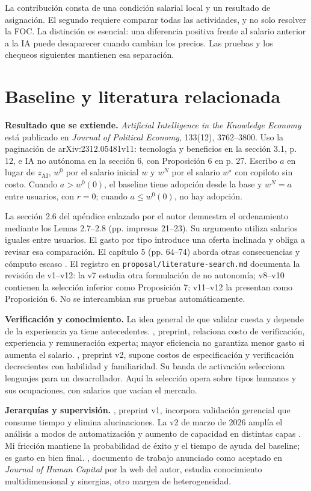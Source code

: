 \documentclass[11pt]{article}
\begin{document}
La contribución consta de una condición salarial local y un resultado de asignación. El segundo requiere comparar todas las actividades, y no solo resolver la FOC. La distinción es esencial: una diferencia positiva frente al salario anterior a la IA puede desaparecer cuando cambian los precios. Las pruebas y los chequeos siguientes mantienen esa separación.
\newpage
\section{Baseline y literatura relacionada}
\textbf{Resultado que se extiende.} \emph{Artificial Intelligence in the Knowledge Economy} está publicado en \emph{Journal of Political Economy}, 133(12), 3762--3800. Uso la paginación de arXiv:2312.05481v11: tecnología y beneficios en la sección 3.1, p. 12, e IA no autónoma en la sección 6, con Proposición 6 en p. 27. Escribo $a$ en lugar de $z_{\mathrm{AI}}$, $w^0$ por el salario inicial $w$ y $w^N$ por el salario $w^\star$ con copiloto sin costo. Cuando $a>w^0(0)$, el baseline tiene adopción desde la base y $w^N=a$ entre usuarios, con $r=0$; cuando $a\leq w^0(0)$, no hay adopción.

La sección 2.6 del apéndice enlazado por el autor demuestra el ordenamiento mediante los Lemas 2.7--2.8 (pp. impresas 21--23). Su argumento utiliza salarios iguales entre usuarios. El gasto por tipo introduce una oferta inclinada y obliga a revisar esa comparación. El capítulo 5 (pp. 64--74) aborda otras consecuencias y cómputo escaso \citep{appendix}. El registro en \texttt{proposal/literature-search.md} documenta la revisión de v1--v12: la v7 estudia otra formulación de no autonomía; v8--v10 contienen la selección inferior como Proposición 7; v11--v12 la presentan como Proposición 6. No se intercambian sus pruebas automáticamente.

\textbf{Verificación y conocimiento.} La idea general de que validar cuesta y depende de la experiencia ya tiene antecedentes. \citet{catalini}, preprint, relaciona costo de verificación, experiencia y remuneración experta; mayor eficiencia no garantiza menor gasto si aumenta el salario. \citet{quispe2026}, preprint v2, supone costos de especificación y verificación decrecientes con habilidad y familiaridad. Su banda de activación selecciona lenguajes para un desarrollador. Aquí la selección opera sobre tipos humanos y sus ocupaciones, con salarios que vacían el mercado.

\textbf{Jerarquías y supervisión.} \citet{xu2025}, preprint v1, incorpora validación gerencial que consume tiempo y elimina alucinaciones. La v2 de marzo de 2026 amplía el análisis a modos de automatización y aumento de capacidad en distintas capas \citep{xu2026}. Mi fricción mantiene la probabilidad de éxito y el tiempo de ayuda del baseline; es gasto en bien final. \citet{turing}, documento de trabajo anunciado como aceptado en \emph{Journal of Human Capital} por la web del autor, estudia conocimiento multidimensional y sinergias, otro margen de heterogeneidad.
\end{document}
